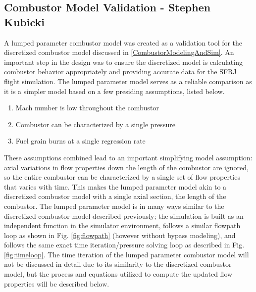 \subsection{Combustor Model Validation - Stephen Kubicki}
A lumped parameter combustor model was created as a validation tool for the discretized combustor model discussed in \ref{CombustorModelingAndSim}. An important step in the design was to ensure the discretized model is calculating combustor behavior appropriately and providing accurate data for the SFRJ flight simulation. The lumped parameter model serves as a reliable comparison as it is a simpler model based on a few presiding assumptions, listed below. 

\begin{enumerate}
  \item Mach number is low throughout the combustor
  \item Combustor can be characterized by a single pressure
  \item Fuel grain burns at a single regression rate \\
\end{enumerate}

These assumptions combined lead to an important simplifying model assumption: axial variations in flow properties down the length of the combustor are ignored, so the entire combustor can be characterized by a single set of flow properties that varies with time. This makes the lumped parameter model akin to a discretized combustor model with a single axial section, the length of the combustor. The lumped parameter model is in many ways similar to the discretized combustor model described previously; the simulation is built as an independent function in the simulator environment, follows a similar flowpath loop as shown in Fig. \ref{fig:flowpath} (however without bypass modeling), and follows the same exact time iteration/pressure solving loop as described in Fig. \ref{fig:timeloop}. The time iteration of the lumped parameter combustor model will not be discussed in detail due to its similarity to the discretized combustor model, but the process and equations utilized to compute the updated flow properties will be described below. 

